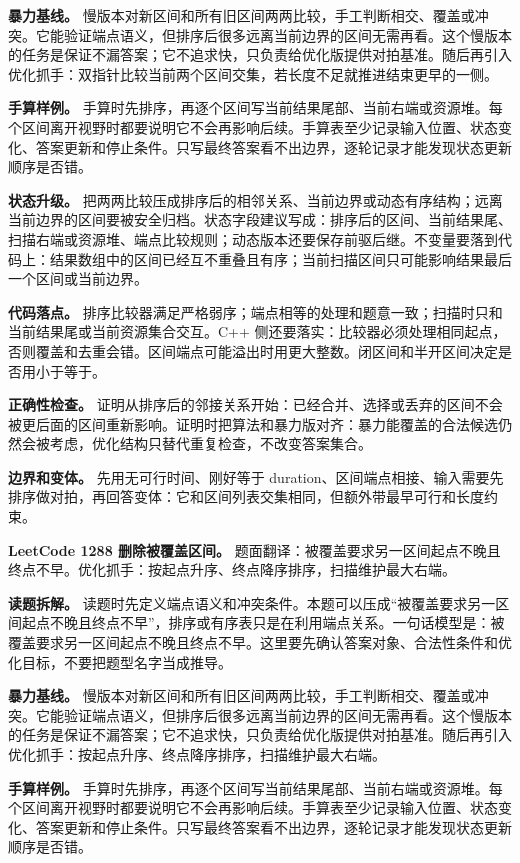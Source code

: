\textbf{暴力基线。} 慢版本对新区间和所有旧区间两两比较，手工判断相交、覆盖或冲突。它能验证端点语义，但排序后很多远离当前边界的区间无需再看。这个慢版本的任务是保证不漏答案；它不追求快，只负责给优化版提供对拍基准。随后再引入优化抓手：双指针比较当前两个区间交集，若长度不足就推进结束更早的一侧。

\textbf{手算样例。} 手算时先排序，再逐个区间写当前结果尾部、当前右端或资源堆。每个区间离开视野时都要说明它不会再影响后续。手算表至少记录输入位置、状态变化、答案更新和停止条件。只写最终答案看不出边界，逐轮记录才能发现状态更新顺序是否错。

\textbf{状态升级。} 把两两比较压成排序后的相邻关系、当前边界或动态有序结构；远离当前边界的区间要被安全归档。状态字段建议写成：排序后的区间、当前结果尾、扫描右端或资源堆、端点比较规则；动态版本还要保存前驱后继。不变量要落到代码上：结果数组中的区间已经互不重叠且有序；当前扫描区间只可能影响结果最后一个区间或当前边界。

\textbf{代码落点。} 排序比较器满足严格弱序；端点相等的处理和题意一致；扫描时只和当前结果尾或当前资源集合交互。C++ 侧还要落实：比较器必须处理相同起点，否则覆盖和去重会错。区间端点可能溢出时用更大整数。闭区间和半开区间决定是否用小于等于。

\textbf{正确性检查。} 证明从排序后的邻接关系开始：已经合并、选择或丢弃的区间不会被更后面的区间重新影响。证明时把算法和暴力版对齐：暴力能覆盖的合法候选仍然会被考虑，优化结构只替代重复检查，不改变答案集合。

\textbf{边界和变体。} 先用无可行时间、刚好等于 duration、区间端点相接、输入需要先排序做对拍，再回答变体：它和区间列表交集相同，但额外带最早可行和长度约束。

\noindent\textbf{LeetCode 1288 删除被覆盖区间。} 题面翻译：被覆盖要求另一区间起点不晚且终点不早。优化抓手：按起点升序、终点降序排序，扫描维护最大右端。

\textbf{读题拆解。} 读题时先定义端点语义和冲突条件。本题可以压成“被覆盖要求另一区间起点不晚且终点不早”，排序或有序表只是在利用端点关系。一句话模型是：被覆盖要求另一区间起点不晚且终点不早。这里要先确认答案对象、合法性条件和优化目标，不要把题型名字当成推导。

\textbf{暴力基线。} 慢版本对新区间和所有旧区间两两比较，手工判断相交、覆盖或冲突。它能验证端点语义，但排序后很多远离当前边界的区间无需再看。这个慢版本的任务是保证不漏答案；它不追求快，只负责给优化版提供对拍基准。随后再引入优化抓手：按起点升序、终点降序排序，扫描维护最大右端。

\textbf{手算样例。} 手算时先排序，再逐个区间写当前结果尾部、当前右端或资源堆。每个区间离开视野时都要说明它不会再影响后续。手算表至少记录输入位置、状态变化、答案更新和停止条件。只写最终答案看不出边界，逐轮记录才能发现状态更新顺序是否错。


